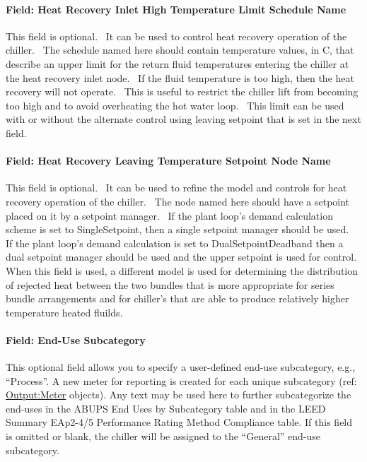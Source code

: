 \paragraph{Field: Heat Recovery Inlet High Temperature Limit Schedule Name}\label{field-heat-recovery-inlet-high-temperature-limit-schedule-name-2}

This field is optional.~ It can be used to control heat recovery operation of the chiller.~ The schedule named here should contain temperature values, in C, that describe an upper limit for the return fluid temperatures entering the chiller at the heat recovery inlet node.~ If the fluid temperature is too high, then the heat recovery will not operate.~ This is useful to restrict the chiller lift from becoming too high and to avoid overheating the hot water loop.~ This limit can be used with or without the alternate control using leaving setpoint that is set in the next field.

\paragraph{Field: Heat Recovery Leaving Temperature Setpoint Node Name}\label{field-heat-recovery-leaving-temperature-setpoint-node-name-2}

This field is optional.~ It can be used to refine the model and controls for heat recovery operation of the chiller.~ The node named here should have a setpoint placed on it by a setpoint manager.~ If the plant loop's demand calculation scheme is set to SingleSetpoint, then a single setpoint manager should be used.~ If the plant loop's demand calculation is set to DualSetpointDeadband then a dual setpoint manager should be used and the upper setpoint is used for control.~ When this field is used, a different model is used for determining the distribution of rejected heat between the two bundles that is more appropriate for series bundle arrangements and for chiller's that are able to produce relatively higher temperature heated fluilds.

\paragraph{Field: End-Use Subcategory}\label{end-use-subcategory-12}

This optional field allows you to specify a user-defined end-use subcategory, e.g., ``Process''. A new meter for reporting is created for each unique subcategory (ref: \hyperref[outputmeter-and-outputmetermeterfileonly]{Output:Meter} objects). Any text may be used here to further subcategorize the end-uses in the ABUPS End Uses by Subcategory table and in the LEED Summary EAp2-4/5 Performance Rating Method Compliance table. If this field is omitted or blank, the chiller will be assigned to the ``General'' end-use subcategory.


